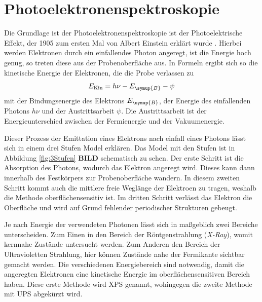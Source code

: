     \section{Photoelektronenspektroskopie} \label{sec:PES}
    Die Grundlage ist der Photoelektronenspektroskopie ist der Photoelektrische Effekt, der 1905 zum ersten Mal von Albert Einstein erklärt wurde \cite{Einstein}.
    Hierbei werden Elektronen durch ein einfallendes Photon angeregt, ist die Energie hoch genug, so treten diese aus der Probenoberfläche aus.
    In Formeln ergibt sich so die kinetische Energie der Elektronen, die die Probe verlassen zu 
    \begin{equation}
        E_{\text{Kin}} = h \nu - E_{\symup{B}} - \psi
        \label{eqn:Photoeffekt}
    \end{equation}
    mit der Bindungsenergie des Elektrons $E_{\symup{B}}$, der Energie des einfallenden Photons $h \nu$ und der Austrittsarbeit $\psi$.
    Die Austrittsarbeit ist der Energieunterschied zwischen der Fermienergie und der Vakuumenergie.

    Dieser Prozess der Emittation eines Elektrons nach einfall eines Photons lässt sich in einem drei Stufen Model erklären.
    Das Model mit den Stufen ist in Abbildung \ref{fig:3Stufen} \textbf{BILD} schematisch zu sehen.
    Der erste Schritt ist die Absorption des Photons, wodurch das Elektron angeregt wird. 
    Dieses kann dann innerhalb des Festkörpers zur Probenoberfläche wandern.
    In diesem zweiten Schritt kommt auch die mittlere freie Weglänge der Elektroen zu tragen, weshalb die Methode oberflächensensitiv ist.
    Im dritten Schritt verlässt das Elektron die Oberfläche und wird auf Grund fehlender periodischer Strukturen gebeugt.

    Je nach Energie der verwendeten Photonen lässt sich in maßgeblich zwei Bereiche unterscheiden.
    Zum Einen in den Bereich der Röntgenstrahlung (\textit{X-Ray}), womit kernnahe Zustände untersucht werden.
    Zum Anderen den Bereich der Ultravioletten Strahlung, hier können Zustände nahe der Fermikante sichtbar gemacht werden.
    Die verschiedenen Energiebereich sind notwendig, damit die angeregten Elektronen eine kinetische Energie im oberflächensensitiven Bereich haben.
    Diese erste Methode wird XPS genannt, wohingegen die zweite Methode mit UPS abgekürzt wird.

